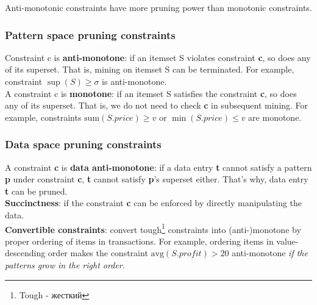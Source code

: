 Anti-monotonic constraints have more pruning power than monotonic constraints.

\subsubsection{Pattern space pruning constraints}
Constraint c is \textbf{anti-monotone}: if an itemset S violates constraint \textbf{c}, so does any of its superset. That is, mining on itemset S can be terminated. For example, constraint $\sup(S) \geqslant \sigma$ is anti-monotone.\\

A constraint c is \textbf{monotone}: if an itemset S satisfies the constraint \textbf{c}, so does any of its superset. That is, we do not need to check \textbf{c} in subsequent mining. For example, constraints $\mathrm{sum}(S.price) \geqslant v$ or $\min(S.price) \leqslant v$ are monotone.

\subsubsection{Data space pruning constraints}
A constraint \textbf{c} is \textbf{data anti-monotone}: if a data entry \textbf{t} cannot satisfy a pattern \textbf{p} under constraint \textbf{c}, \textbf{t} cannot satisfy \textbf{p}’s superset either. That's why, data entry \textbf{t} can be pruned.\\

\textbf{Succinctness}: if the constraint \textbf{c} can be enforced by directly manipulating the data.\\

\textbf{Convertible constraints}: convert tough\footnote{Tough - жесткий} constraints into (anti-)monotone by proper ordering of items in transactions. For example, ordering items in value-descending order makes the constraint $\mathrm{avg}(S.profit) > 20$ anti-monotone \textit{if the patterns grow in the right order}.

